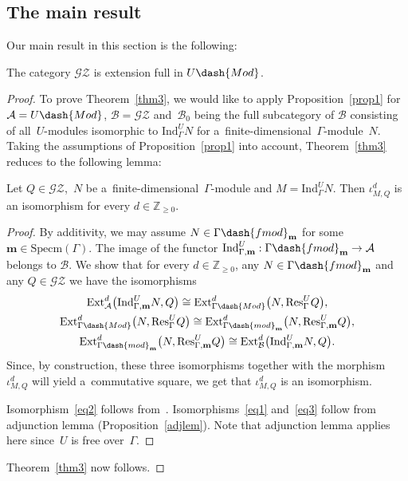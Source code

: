 \documentclass[pdftex]{sigma}
\begin{document}
\subsection{The main result}%

Our main result in this section is the following:

\begin{theorem}
\label{thm3}
The category $\mathscr{G}\mathscr{Z}$ is extension full in $U\dash{Mod}$.
\end{theorem}

\begin{proof}
To prove Theorem~\ref{thm3}, we would like to apply Proposition~\ref{prop1} for $\mathcal{A}=U\dash{Mod}$,
$\mathcal{B}=\mathscr{G}\mathscr{Z}$ and~$\mathcal{B}_0$ being the full subcategory of $\mathcal{B}$ consisting of
all~$U$-modules isomorphic to $\mathrm{Ind}_{\Gamma}^U N$ for a~f\/inite-dimensional~$\Gamma$-module~$N$.
Taking the assumptions of Proposition~\ref{prop1} into account, Theorem~\ref{thm3} reduces to the following lemma:

\begin{lemma}
Let $Q\in\mathscr{G}\mathscr{Z}$,~$N$ be a~finite-dimensional~$\Gamma$-module and $M=\mathrm{Ind}_{\Gamma}^U N$.
Then $\iota^d_{M,Q}$ is an isomorphism for every $d\in\mathbb{Z}_{\geq 0}$.
\end{lemma}

\begin{proof}
By additivity, we may assume $N\in \Gamma\dash{fmod}_{\mathbf{m}}$ for some $\mathbf{m}\in\mathrm{Specm}(\Gamma)$.
The image of the functor $\mathrm{Ind}_{\Gamma,\mathbf{m}}^U:\Gamma\dash{fmod}_{\mathbf{m}}\to \mathcal{A}$ belongs to
$\mathcal{B}$.
We show that for every $d\in\mathbb{Z}_{\geq 0}$, any $N\in \Gamma\dash{fmod}_{\mathbf{m}}$ and any
$Q\in\mathscr{G}\mathscr{Z}$ we have the isomorphisms
\begin{gather}
\label{eq1}
\mathrm{Ext}^d_{\mathcal{A}}\big(\mathrm{Ind}_{\Gamma,\mathbf{m}}^U N, Q\big)  \cong
\mathrm{Ext}^d_{\Gamma\dash{Mod}}\big(N,\mathrm{Res}_{\Gamma}^U Q\big),
\\
\label{eq2}
\mathrm{Ext}^d_{\Gamma\dash{Mod}}\big(N,\mathrm{Res}_{\Gamma}^U Q\big)  \cong
\mathrm{Ext}^d_{\Gamma\dash{mod}_{\mathbf{m}}}\big(N,\mathrm{Res}_{\Gamma,\mathbf{m}}^U Q\big),
\\
\label{eq3}
\mathrm{Ext}^d_{\Gamma\dash{mod}_{\mathbf{m}}}\big(N,\mathrm{Res}_{\Gamma,\mathbf{m}}^U Q\big)  \cong
\mathrm{Ext}^d_{\mathcal{B}}\big(\mathrm{Ind}_{\Gamma,\mathbf{m}}^U N, Q\big).
\end{gather}
Since, by construction, these three isomorphisms together with the morphism $\iota^d_{M,Q}$ will yield a~commutative
square, we get that $\iota^d_{M,Q}$ is an isomorphism.

Isomorphism~\eqref{eq2} follows from~\cite[Lemma~17]{CoMa}.
Isomorphisms~\eqref{eq1} and~\eqref{eq3} follow from adjunction lemma (Proposition~\ref{adjlem}).
Note that adjunction lemma applies here since~$U$ is free over~$\Gamma$.
\end{proof}

Theorem~\ref{thm3} now follows.
\end{proof}
\end{document}
